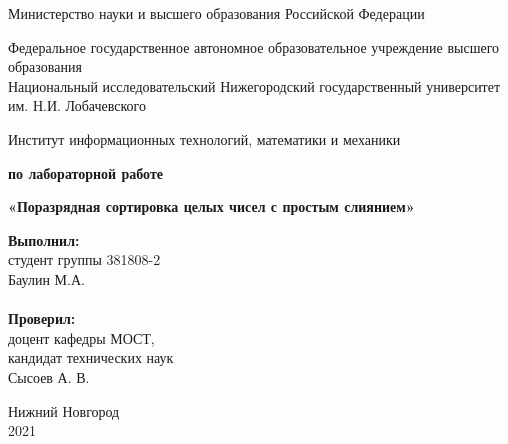 \documentclass{report}
\begin{document}
    \begin{titlepage}

        \begin{center}
            Министерство науки и высшего образования Российской Федерации
        \end{center}

        \begin{center}
            Федеральное государственное автономное образовательное учреждение высшего образования \\
            Национальный исследовательский Нижегородский государственный университет им. Н.И. Лобачевского
        \end{center}

        \begin{center}
            Институт информационных технологий, математики и механики
        \end{center}

        \vspace{4em}

        \begin{center}
            \textbf{ по лабораторной работе} \\
        \end{center}
        \begin{center}
            \textbf{\Large«Поразрядная сортировка целых чисел с простым слиянием»} \\
        \end{center}

        \vspace{4em}

        \newbox{\lbox}
        \newlength{\maxl}
        \setlength{\maxl}{\wd\lbox}
        \hfill\parbox{7cm}{
            \hspace*{5cm}\hspace*{-5cm}\textbf{Выполнил:} \\ студент группы 381808-2 \\ Баулин М.А. \\
            \\
            \hspace*{5cm}\hspace*{-5cm}\textbf{Проверил:}\\ доцент кафедры МОСТ, \\ кандидат технических наук \\ Сысоев А. В. \\
        }
        \vspace{\fill}

        \begin{center} Нижний Новгород \\ 2021 \end{center}

    \end{titlepage}
\end{document}
